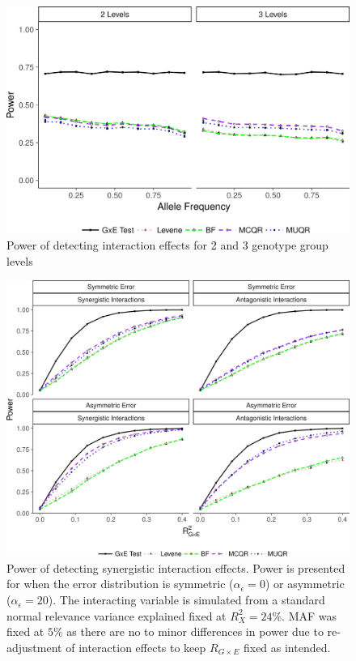 \documentclass[12pt]{article}
\begin{document}
\newpage
\begin{figure}[h!]
	\centering
	\includegraphics[width=1 \textwidth, height=0.6\textwidth]{Figures/power_nominal_cVar23_t.jpg}
	\caption{Power of detecting interaction effects for 2 and 3 genotype group levels}
	\label{fig:PowLevel}
\end{figure}

\newpage
\begin{figure}[h!]
	\centering
	\includegraphics[width=1 \textwidth, height=0.85\textwidth]{Figures//Power_Int.jpg}
	\caption{Power of detecting synergistic interaction effects. Power is presented for when the error distribution is symmetric ($\alpha_\epsilon = 0$) or asymmetric ($\alpha_\epsilon = 20$).  The interacting variable is simulated from a standard normal relevance variance explained fixed at $R^{2}_{X}=24\%$. MAF was fixed at $5\%$ as there are no to minor differences in power due to re-adjustment of interaction effects to keep $R_{G \times E}$ fixed as intended.}
	\label{fig:Pow1}
\end{figure}
\end{document}
